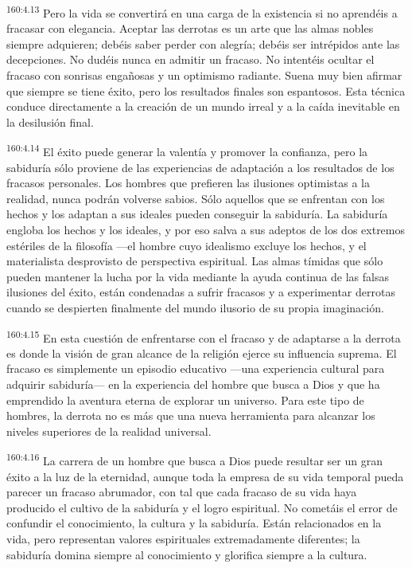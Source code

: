 \par
\textsuperscript{160:4.13} Pero la vida se convertirá en una carga de la existencia si no aprendéis a fracasar con elegancia. Aceptar las derrotas es un arte que las almas nobles siempre adquieren; debéis saber perder con alegría; debéis ser intrépidos ante las decepciones. No dudéis nunca en admitir un fracaso. No intentéis ocultar el fracaso con sonrisas engañosas y un optimismo radiante. Suena muy bien afirmar que siempre se tiene éxito, pero los resultados finales son espantosos. Esta técnica conduce directamente a la creación de un mundo irreal y a la caída inevitable en la desilusión final.

\par
\textsuperscript{160:4.14} El éxito puede generar la valentía y promover la confianza, pero la sabiduría sólo proviene de las experiencias de adaptación a los resultados de los fracasos personales. Los hombres que prefieren las ilusiones optimistas a la realidad, nunca podrán volverse sabios. Sólo aquellos que se enfrentan con los hechos y los adaptan a sus ideales pueden conseguir la sabiduría. La sabiduría engloba los hechos y los ideales, y por eso salva a sus adeptos de los dos extremos estériles de la filosofía ---el hombre cuyo idealismo excluye los hechos, y el materialista desprovisto de perspectiva espiritual. Las almas tímidas que sólo pueden mantener la lucha por la vida mediante la ayuda continua de las falsas ilusiones del éxito, están condenadas a sufrir fracasos y a experimentar derrotas cuando se despierten finalmente del mundo ilusorio de su propia imaginación.

\par
\textsuperscript{160:4.15} En esta cuestión de enfrentarse con el fracaso y de adaptarse a la derrota es donde la visión de gran alcance de la religión ejerce su influencia suprema. El fracaso es simplemente un episodio educativo ---una experiencia cultural para adquirir sabiduría--- en la experiencia del hombre que busca a Dios y que ha emprendido la aventura eterna de explorar un universo. Para este tipo de hombres, la derrota no es más que una nueva herramienta para alcanzar los niveles superiores de la realidad universal.

\par
\textsuperscript{160:4.16} La carrera de un hombre que busca a Dios puede resultar ser un gran éxito a la luz de la eternidad, aunque toda la empresa de su vida temporal pueda parecer un fracaso abrumador, con tal que cada fracaso de su vida haya producido el cultivo de la sabiduría y el logro espiritual. No cometáis el error de confundir el conocimiento, la cultura y la sabiduría. Están relacionados en la vida, pero representan valores espirituales extremadamente diferentes; la sabiduría domina siempre al conocimiento y glorifica siempre a la cultura.

